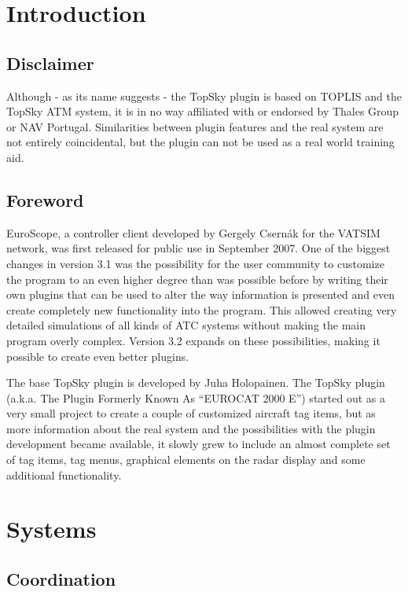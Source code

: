 \documentclass[a4paper,oneside,11pt]{memoir}
\begin{document}
\startmanual

\chapter{Introduction}

\section{Disclaimer}

Although - as its name suggests - the TopSky plugin is based on TOPLIS and the TopSky ATM system, it is in no way affiliated with or endorsed by Thales Group or NAV Portugal. Similarities between plugin features and the real system are not entirely coincidental, but the plugin can not be used as a real world training aid.

\section{Foreword}

EuroScope, a controller client developed by Gergely Csernák for the VATSIM network, was first released for public use in September 2007. One of the biggest changes in version 3.1 was the possibility for the user community to customize the program to an even higher degree than was possible before by writing their own plugins that can be used to alter the way information is presented and even create completely new functionality into the program. This allowed creating very detailed simulations of all kinds of ATC systems without making the main program overly complex. Version 3.2 expands on these possibilities, making it possible to create even better plugins.

\bigskip

The base TopSky plugin is developed by Juha Holopainen. The TopSky plugin (a.k.a. The Plugin Formerly Known As “EUROCAT 2000 E”) started out as a very small project to create a couple of customized aircraft tag items, but as more information about the real system and the possibilities with the plugin development became available, it slowly grew to include an almost complete set of tag items, tag menus, graphical elements on the radar display and some additional functionality.\cite{topskygen}

\chapter{Systems}

\section{Coordination}
\end{document}
